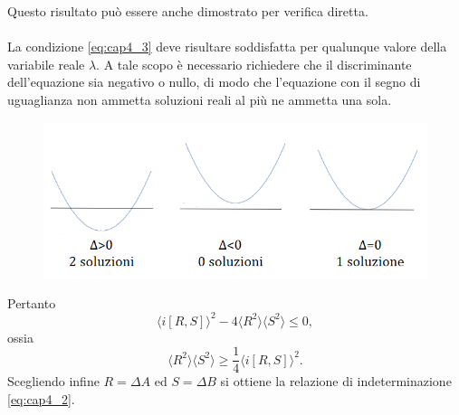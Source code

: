 \documentclass[a4paper,12pt,oneside]{book}
\begin{document}
Questo risultato può essere anche dimostrato per verifica diretta.\\ 
\\
La condizione \eqref{eq:cap4_3} deve risultare soddisfatta per qualunque valore della variabile reale $\lambda$. A tale scopo è necessario richiedere che il discriminante dell'equazione sia negativo o nullo, di modo che l'equazione con il segno di uguaglianza non ammetta soluzioni reali  al più ne ammetta una sola.
\newpage
\begin{figure}[!htbp]
\begin{center}
\includegraphics[width=.9\textwidth]{immagini/cap_4/fig_4_1.png}
\end{center}
\end{figure}
Pertanto
\begin{equation}
\langle i \left[R,S \right] \rangle ^2 - 4\langle R^2 \rangle \langle S^2 \rangle \leq 0,
\end{equation}
ossia
\begin{equation}
\langle R^2 \rangle \langle S^2 \rangle \geq \frac{1}{4}\langle i \left[R,S \right] \rangle ^2.
\end{equation}
Scegliendo infine $R=\Delta A$ ed $S= \Delta B$ si ottiene la relazione di indeterminazione \eqref{eq:cap4_2}.
\end{document}
